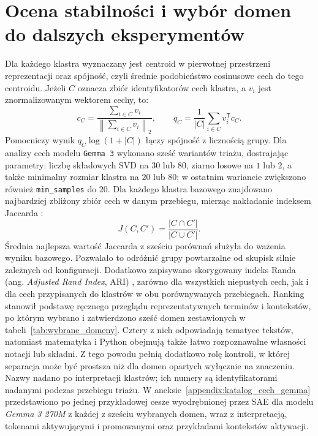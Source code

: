 \section{Ocena stabilności i wybór domen do dalszych eksperymentów}
\label{sec:wybor_domen}
Dla każdego klastra wyznaczany jest centroid w pierwotnej przestrzeni reprezentacji oraz spójność, czyli średnie podobieństwo cosinusowe cech do tego centroidu. Jeżeli $C$ oznacza zbiór identyfikatorów cech klastra, a $v_i$ jest znormalizowanym wektorem cechy, to:
\[
c_C=\frac{\sum_{i\in C}v_i}{\left\|\sum_{i\in C}v_i\right\|_2},
\qquad
q_C=\frac{1}{|C|}\sum_{i\in C}v_i^{\mathsf T}c_C.
\]
Pomocniczy wynik $q_C\log(1+|C|)$ łączy spójność z licznością grupy. \newline
Dla analizy cech modelu \texttt{Gemma 3} wykonano sześć wariantów triażu, dostrajając parametry: liczbę składowych SVD na $30$ lub $80$, ziarno losowe na $1$ lub $2$, a także minimalny rozmiar klastra na $20$ lub $80$; w ostatnim wariancie zwiększono również \texttt{min\_samples} do $20$. Dla każdego klastra bazowego znajdowano najbardziej zbliżony zbiór cech w danym przebiegu, mierząc nakładanie indeksem Jaccarda \cite{jaccard_1901_etude_distribution_florale}:
\[
J(C,C')=\frac{|C\cap C'|}{|C\cup C'|}.
\]
Średnia najlepsza wartość Jaccarda z sześciu porównań służyła do ważenia wyniku bazowego. Pozwalało to odróżnić grupy powtarzalne od skupisk silnie zależnych od konfiguracji. Dodatkowo zapisywano skorygowany indeks Randa (ang. \textit{Adjusted Rand Index}, ARI) \cite{hubert_1985_comparing_partitions}, zarówno dla wszystkich niepustych cech, jak i dla cech przypisanych do klastrów w obu porównywanych przebiegach. \newline
Ranking stanowił podstawę ręcznego przeglądu reprezentatywnych terminów i kontekstów, po którym wybrano i zatwierdzono sześć domen zestawionych w tabeli~\ref{tab:wybrane_domeny}. Cztery z nich odpowiadają tematyce tekstów, natomiast matematyka i Python obejmują także łatwo rozpoznawalne własności notacji lub składni. Z tego powodu pełnią dodatkowo rolę kontroli, w której separacja może być prostsza niż dla domen opartych wyłącznie na znaczeniu. Nazwy nadano po interpretacji klastrów; ich numery są identyfikatorami nadanymi podczas przebiegu triażu. W aneksie~\ref{appendix:katalog_cech_gemma} przedstawiono po jednej przykładowej cesze wyodrębnionej przez SAE dla modelu \textit{Gemma 3 270M} z każdej z sześciu wybranych domen, wraz z interpretacją, tokenami aktywującymi i promowanymi oraz przykładami kontekstów aktywacji. 
